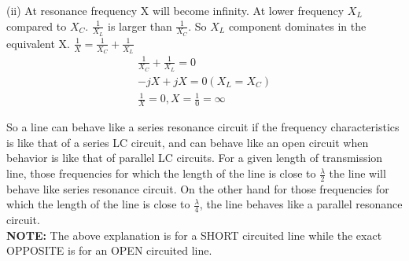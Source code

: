 (ii) At resonance frequency X will become infinity. At lower frequency $ X_{L} $ compared to $ X_{C} $. $ \frac{1}{X_{L}} $ is larger than $ \frac{1}{X_{C}} $. So $ X_{L} $ component dominates in the equivalent X. $ \frac{1}{X} = \frac{1}{X_{C}} + \frac{1}{X_{L}}$
\begin{align*}
\frac{1}{X_{C}} + \frac{1}{X_{L}} = 0\\
-jX + jX = 0 (X_{L} = X_{C})\\
\frac{1}{X} = 0, X = \frac{1}{0} = \infty
\end{align*}

So a line can behave like a series resonance circuit  if the frequency characteristics is like that of a series LC circuit, and can behave like an open circuit when behavior is like that of parallel LC circuits.
For a given length of transmission line, those frequencies for which the length of the line is close to $ \frac{\lambda}{2} $ the line will behave like series resonance circuit. On the other hand for those frequencies for which the length of the line is close to $ \frac{\lambda}{4} $, the line behaves like a parallel resonance circuit.\\
\textbf{NOTE:} The above explanation is for a SHORT circuited line while the exact OPPOSITE is for an OPEN circuited line.\\

